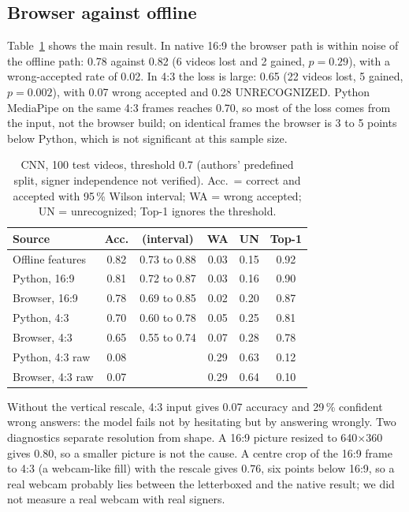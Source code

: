 \documentclass[conference]{IEEEtran}
\begin{document}
\subsection{Browser against offline}
Table~\ref{tab:bvo} shows the main result. In native 16:9 the browser path is within noise of the offline path: 0.78 against 0.82 (6 videos lost and 2 gained, $p=0.29$), with a wrong-accepted rate of 0.02. In 4:3 the loss is large: 0.65 (22 videos lost, 5 gained, $p=0.002$), with 0.07 wrong accepted and 0.28 UNRECOGNIZED. Python MediaPipe on the same 4:3 frames reaches 0.70, so most of the loss comes from the input, not the browser build; on identical frames the browser is 3 to 5 points below Python, which is not significant at this sample size.

\begin{table}[t]
\caption{CNN, 100 test videos, threshold 0.7 (authors' predefined split, signer independence not verified). Acc.\ = correct and accepted with 95\,\% Wilson interval; WA = wrong accepted; UN = unrecognized; Top-1 ignores the threshold.}
\label{tab:bvo}
\centering
\small
\begin{tabular}{lccccc}
\hline
Source & Acc. & (interval) & WA & UN & Top-1\\
\hline
Offline features & 0.82 & 0.73 to 0.88 & 0.03 & 0.15 & 0.92\\
Python, 16:9 & 0.81 & 0.72 to 0.87 & 0.03 & 0.16 & 0.90\\
Browser, 16:9 & 0.78 & 0.69 to 0.85 & 0.02 & 0.20 & 0.87\\
Python, 4:3 & 0.70 & 0.60 to 0.78 & 0.05 & 0.25 & 0.81\\
Browser, 4:3 & 0.65 & 0.55 to 0.74 & 0.07 & 0.28 & 0.78\\
Python, 4:3 raw & 0.08 & & 0.29 & 0.63 & 0.12\\
Browser, 4:3 raw & 0.07 & & 0.29 & 0.64 & 0.10\\
\hline
\end{tabular}
\end{table}

Without the vertical rescale, 4:3 input gives 0.07 accuracy and 29\,\% confident wrong answers: the model fails not by hesitating but by answering wrongly. Two diagnostics separate resolution from shape. A 16:9 picture resized to 640$\times$360 gives 0.80, so a smaller picture is not the cause. A centre crop of the 16:9 frame to 4:3 (a webcam-like fill) with the rescale gives 0.76, six points below 16:9, so a real webcam probably lies between the letterboxed and the native result; we did not measure a real webcam with real signers.
\end{document}
